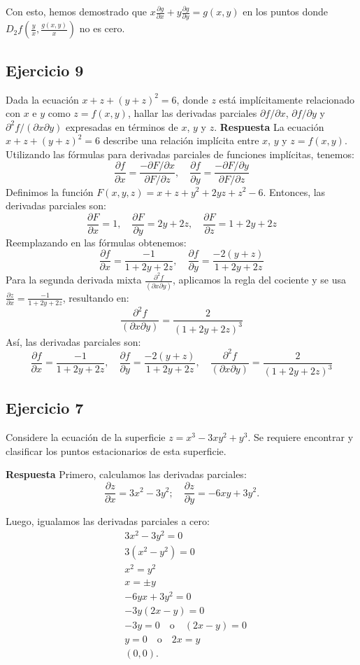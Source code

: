 \documentclass{report}
\begin{document}
Con esto, hemos demostrado que $x \frac{\partial g}{\partial x}+y \frac{\partial g}{\partial y}=g(x, y)$ en los puntos donde $D_2 f\left(\frac{y}{x}, \frac{g(x, y)}{x}\right)$ no es cero.\subsection{Ejercicio 9}
Dada la ecuación $x + z + (y + z)^2 = 6$, donde $z$ está implícitamente relacionado con $x$ e $y$ como $z = f(x, y)$, hallar las derivadas parciales $\partial f / \partial x$, $\partial f / \partial y$ y $\partial^{2} f /(\partial x \partial y)$ expresadas en términos de $x$, $y$ y $z$.
\textbf{Respuesta}
La ecuación $x + z + (y + z)^2 = 6$ describe una relación implícita entre $x$, $y$ y $z = f(x, y)$. Utilizando las fórmulas para derivadas parciales de funciones implícitas, tenemos:
\[
\frac{\partial f}{\partial x} = \frac{-\partial F / \partial x}{\partial F / \partial z}, \quad 
\frac{\partial f}{\partial y} = \frac{-\partial F / \partial y}{\partial F / \partial z}
\]
Definimos la función $F(x, y, z) = x + z + y^2 + 2yz + z^2 - 6$. Entonces, las derivadas parciales son:
\[
\frac{\partial F}{\partial x} = 1, \quad \frac{\partial F}{\partial y} = 2y + 2z, \quad \frac{\partial F}{\partial z} = 1 + 2y + 2z
\]
Reemplazando en las fórmulas obtenemos:
\[
\frac{\partial f}{\partial x} = \frac{-1}{1 + 2y + 2z}, \quad 
\frac{\partial f}{\partial y} = \frac{-2(y + z)}{1 + 2y + 2z}
\]
Para la segunda derivada mixta $\frac{\partial^2 f}{(\partial x \partial y)}$, aplicamos la regla del cociente y se usa $\frac{\partial z}{\partial x} = \frac{-1}{1 + 2y + 2z}$, resultando en:
\[
\frac{\partial^2 f}{(\partial x \partial y)} = \frac{2}{(1 + 2y + 2z)^3}
\]
Así, las derivadas parciales son:
\[
\frac{\partial f}{\partial x} = \frac{-1}{1 + 2y + 2z}, \quad
\frac{\partial f}{\partial y} = \frac{-2(y + z)}{1 + 2y + 2z}, \quad
\frac{\partial^2 f}{(\partial x \partial y)} = \frac{2}{(1 + 2y + 2z)^3}
\]\subsection{Ejercicio 7} 
Considere la ecuación de la superficie $z=x^{3}-3 x y^{2}+y^{3}$. Se requiere encontrar y clasificar los puntos estacionarios de esta superficie. 

\textbf{Respuesta} 
Primero, calculamos las derivadas parciales:
$$
\frac{\partial z}{\partial x}=3 x^2-3 y^2 ; \quad \frac{\partial z}{\partial y}=-6 x y+3 y^2 .
$$

Luego, igualamos las derivadas parciales a cero:
$$
\begin{aligned}
& 3 x^2-3 y^2=0 \\
& 3\left(x^2-y^2\right)=0 \\
& x^2=y^2 \\
& x=\pm y \\
& -6 y x+3 y^2=0 \\
& -3 y(2 x-y)=0 \\
& -3 y=0 \quad \text{o} \quad (2 x-y)=0 \\
& y=0 \quad \text{o} \quad 2 x=y \\
& (0,0) .
\end{aligned}
$$
\end{document}

